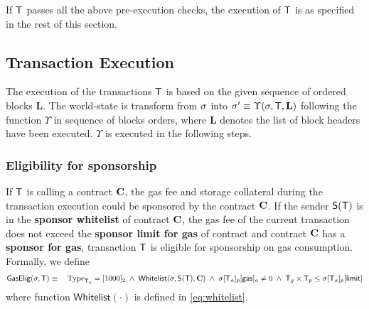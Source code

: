 
If $\textsf{T}$ passes all the above pre-execution checks, the execution of $\textsf{T}$ is as specified in the rest of this section.


\subsection{Transaction Execution}

The execution of the transactions $\textsf{T}$ is based on the given sequence of ordered blocks $\mathbf{L}$. The world-state is transform from $\mathbf{\sigma}$ into $\mathbf{\sigma}'\equiv \Upsilon(\mathbf{\sigma},\textsf{T},\mathbf{L})$ following the function $\Upsilon$ in sequence of blocks orders, where $\mathbf{L}$ denotes the list of block headers have been executed. $\Upsilon$ is executed in the following steps. 

\subsubsection{Eligibility for sponsorship}

If $\textsf{T}$ is calling a contract $\mathbf{C}$, the gas fee and storage collateral during the transaction execution could be sponsored by the contract $\mathbf{C}$. If the sender $\mathsf{S}{\left({\textsf{T}} \right)}$ is in the {\bf sponsor whitelist} of contract $\mathbf{C}$, the gas fee of the current transaction does not exceed the {\bf sponsor limit for gas} of contract and contract $\mathbf{C}$ has a {\bf sponsor for gas}, transaction $\textsf{T}$ is eligible for sponsorship on gas consumption. Formally, we define 
\begin{align}
	\mathsf{GasElig}(\mathbf{\sigma},\textsf{T})\equiv \quad \mathrm{Type}_{\textsf{T}_a}=[1000]_2 \;\wedge\; \mathsf{Whitelist}(\mathbf{\sigma},\mathsf{S}{\left({\textsf{T}} \right)},\mathbf{C}) \;\wedge\; \mathbf{\sigma}[\textsf{T}_a]_p[\mathsf{gas}]_a\neq 0 \;\wedge\; \textsf{T}_g\times\textsf{T}_p \le \mathbf{\sigma}[\textsf{T}_a]_p[\mathsf{limit}] 
\end{align}
where function $\mathsf{Whitelist}(\cdot)$ is defined in \cref{eq:whitelist}. 

